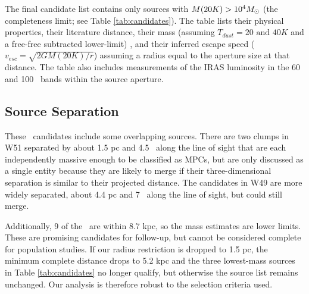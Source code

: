 The final candidate list contains only sources with $M(20K)>10^4 M_{\odot}$ (the
completeness limit; see Table \ref{tab:candidates}).  The table lists
their physical properties, their literature distance, their mass (assuming $T_{dust}=20
\textrm{~and~} 40 K$ and a free-free subtracted lower-limit) ,
and their inferred escape speed ($v_{esc} = \sqrt{2 G M(20K) / r}$) assuming a
radius equal to the aperture size at that distance.  The table also includes
measurements of the IRAS luminosity in the 60 and 100 \um\ bands within the
source aperture.

\subsection{Source Separation}
These \ncandidates\ candidates include some overlapping sources.
There are two clumps in W51 separated by about 1.5 pc and 4.5 \kms\ along the
line of sight that are each independently massive enough to be classified as
MPCs, but are only discussed as a single entity because they are likely
to merge if their three-dimensional separation is similar to their projected
distance.  The candidates in W49 are more widely separated, about 4.4 pc and 7
\kms\ along the line of sight, but could still merge.

Additionally, 9 of the \ncandidates\ are within 8.7 kpc, so the mass
estimates are lower limits.  These are promising candidates for follow-up, but
cannot be considered complete for population studies.  If our radius restriction
is dropped to 1.5 pc, the minimum complete distance drops to 5.2 kpc and the
three lowest-mass sources in Table \ref{tab:candidates} no longer qualify, but
otherwise the source list remains unchanged.  Our analysis is therefore robust
to the selection criteria used.

